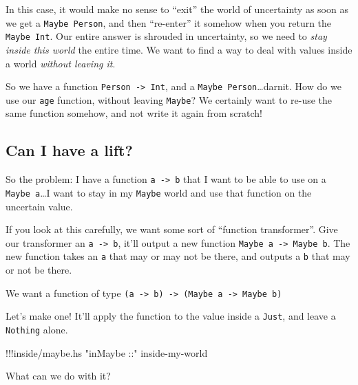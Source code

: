 \documentclass[]{article}
\newenvironment{Shaded}{}{}
\newcommand{\StringTok}[1]{\textcolor[rgb]{0.25,0.44,0.63}{{#1}}}
\newcommand{\FunctionTok}[1]{\textcolor[rgb]{0.02,0.16,0.49}{{#1}}}
\newcommand{\NormalTok}[1]{{#1}}
\begin{document}
In this case, it would make no sense to ``exit'' the world of
uncertainty as soon as we get a \texttt{Maybe\ Person}, and then
``re-enter'' it somehow when you return the \texttt{Maybe\ Int}. Our
entire answer is shrouded in uncertainty, so we need to \emph{stay
inside this world} the entire time. We want to find a way to deal with
values inside a world \emph{without leaving it}.

So we have a function \texttt{Person\ -\textgreater{}\ Int}, and a
\texttt{Maybe\ Person}\ldots{}darnit. How do we use our \texttt{age}
function, without leaving \texttt{Maybe}? We certainly want to re-use
the same function somehow, and not write it again from scratch!

\subsection{Can I have a lift?}\label{can-i-have-a-lift}

So the problem: I have a function \texttt{a\ -\textgreater{}\ b} that I
want to be able to use on a \texttt{Maybe\ a}\ldots{}I want to stay in
my \texttt{Maybe} world and use that function on the uncertain value.

If you look at this carefully, we want some sort of ``function
transformer''. Give our transformer an \texttt{a\ -\textgreater{}\ b},
it'll output a new function
\texttt{Maybe\ a\ -\textgreater{}\ Maybe\ b}. The new function takes an
\texttt{a} that may or may not be there, and outputs a \texttt{b} that
may or not be there.

We want a function of type
\texttt{(a\ -\textgreater{}\ b)\ -\textgreater{}\ (Maybe\ a\ -\textgreater{}\ Maybe\ b)}

Let's make one! It'll apply the function to the value inside a
\texttt{Just}, and leave a \texttt{Nothing} alone.

\begin{Shaded}
\begin{Highlighting}[]
\FunctionTok{!!!}\NormalTok{inside}\FunctionTok{/}\NormalTok{maybe}\FunctionTok{.}\NormalTok{hs }\StringTok{"inMaybe ::"} \NormalTok{inside}\FunctionTok{-}\NormalTok{my}\FunctionTok{-}\NormalTok{world}
\end{Highlighting}
\end{Shaded}

What can we do with it?
\end{document}
